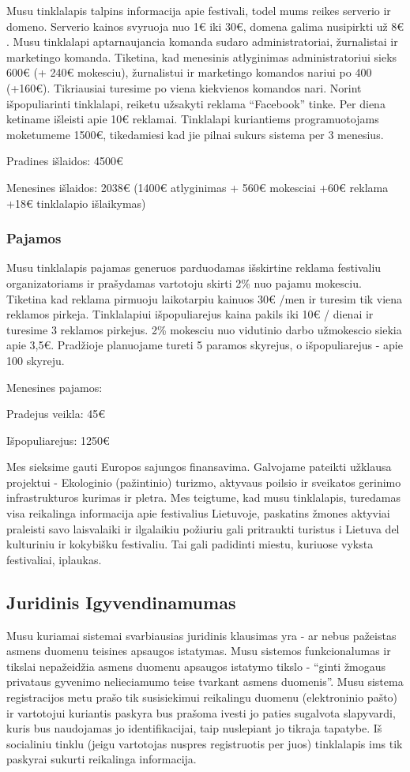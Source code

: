 ﻿\documentclass{VUMIFPSkursinis}
\begin{document}
Musu tinklalapis talpins informacija apie festivali, todel mums reikes serverio ir domeno. Serverio kainos svyruoja nuo 1€ iki 30€, domena galima nusipirkti už 8€ .
Musu tinklalapi aptarnaujancia komanda sudaro administratoriai, žurnalistai ir marketingo komanda. Tiketina, kad menesinis atlyginimas administratoriui sieks 600€ (+ 240€ mokesciu),  žurnalistui ir marketingo komandos nariui po 400 (+160€). Tikriausiai turesime po viena kiekvienos komandos nari.  Norint išpopuliarinti tinklalapi, reiketu užsakyti reklama “Facebook” tinke. Per diena ketiname išleisti apie 10€ reklamai. Tinklalapi kuriantiems programuotojams moketumeme 1500€, tikedamiesi kad jie pilnai sukurs sistema per 3 menesius.
 
Pradines išlaidos: 4500€
 
Menesines išlaidos: 2038€ (1400€ atlyginimas + 560€ mokesciai +60€ reklama +18€ tinklalapio išlaikymas)
 
\subsubsection{Pajamos}
 
Musu tinklalapis pajamas generuos parduodamas išskirtine reklama festivaliu organizatoriams ir prašydamas vartotoju skirti 2\% nuo pajamu mokesciu. Tiketina kad reklama pirmuoju laikotarpiu kainuos 30€ /men ir turesim tik viena reklamos pirkeja. Tinklalapiui išpopuliarejus kaina pakils iki 10€ / dienai ir turesime 3 reklamos pirkejus. 2\% mokesciu nuo vidutinio darbo užmokescio siekia apie 3,5€. Pradžioje planuojame tureti 5 paramos skyrejus, o išpopuliarejus - apie 100 skyreju.
 
Menesines pajamos:
 
Pradejus veikla: 45€
 
Išpopuliarejus: 1250€
 
Mes sieksime gauti Europos sajungos finansavima. Galvojame pateikti užklausa projektui - Ekologinio (pažintinio) turizmo, aktyvaus poilsio ir sveikatos gerinimo infrastrukturos kurimas ir pletra. Mes teigtume, kad musu tinklalapis, turedamas visa reikalinga informacija apie festivalius Lietuvoje, paskatins žmones aktyviai praleisti savo laisvalaiki ir ilgalaikiu požiuriu gali pritraukti turistus i Lietuva del kulturiniu ir kokybišku festivaliu. Tai gali padidinti miestu, kuriuose vyksta festivaliai, iplaukas.
\subsection{Juridinis Igyvendinamumas}
 Musu kuriamai sistemai svarbiausias juridinis klausimas yra - ar nebus pažeistas asmens duomenu teisines apsaugos istatymas. Musu sistemos funkcionalumas ir tikslai nepažeidžia asmens duomenu apsaugos istatymo tikslo - “ginti žmogaus privataus gyvenimo nelieciamumo teise tvarkant asmens duomenis”. Musu sistema registracijos metu prašo tik susisiekimui reikalingu duomenu (elektroninio pašto) ir vartotojui kuriantis paskyra bus prašoma ivesti jo paties sugalvota slapyvardi, kuris bus naudojamas jo identifikacijai, taip nuslepiant jo tikraja tapatybe. Iš socialiniu tinklu (jeigu vartotojas nuspres registruotis per juos) tinklalapis ims tik paskyrai sukurti reikalinga informacija.
\end{document}
